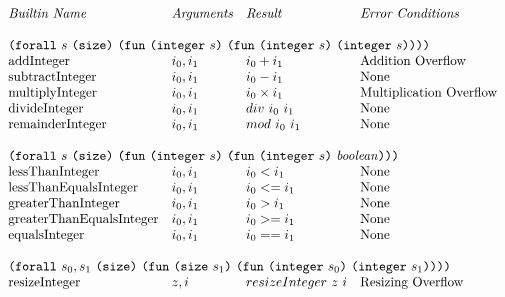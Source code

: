\documentclass[../main.tex]{subfiles}
\begin{document}
\begin{figure*}[t]
    \centering
    \footnotesize
    \[\begin{array}{llll}
        \textit{Builtin Name}               & \textit{Arguments} & \textit{Result} & \textit{Error Conditions}\\
        &&\\
        
        \multicolumn{4}{l}{\forallT{s}{\sizeK{}}{\funT{\integerT{s}}{\funT{\integerT{s}}{\integerT{s}}}}}\\
        \mathrm{addInteger}                 &  i_0 , i_1   &   i_0 + i_1         &   \textrm{Addition Overflow}   \\
        \mathrm{subtractInteger}            &  i_0 , i_1   &   i_0 - i_1         &   \textrm{None}       \\
        \mathrm{multiplyInteger}            &  i_0 , i_1   &   i_0 \times i_1    &   \textrm{Multiplication Overflow}   \\
        \mathrm{divideInteger}              &  i_0 , i_1   &   div ~ i_0 ~ i_1   &   \textrm{None}       \\
        \mathrm{remainderInteger}           &  i_0 , i_1   &   mod ~ i_0 ~ i_1   &   \textrm{None}       \\
        &&\\
        
        \multicolumn{4}{l}{\forallT{s}{\sizeK{}}{\funT{\integerT{s}}{\funT{\integerT{s}}{\mathit{boolean}}}}}\\
        \mathrm{lessThanInteger}            &  i_0 , i_1   &   i_0 < i_1    &   \textrm{None}         \\
        \mathrm{lessThanEqualsInteger}      &  i_0 , i_1   &   i_0 <= i_1   &   \textrm{None}         \\
        \mathrm{greaterThanInteger}         &  i_0 , i_1   &   i_0 > i_1    &   \textrm{None}         \\
        \mathrm{greaterThanEqualsInteger}   &  i_0 , i_1   &   i_0 >= i_1   &   \textrm{None}         \\
        \mathrm{equalsInteger}              &  i_0 , i_1   &   i_0 == i_1   &   \textrm{None}         \\
        &&\\
        
        \multicolumn{4}{l}{\forallT{s_0,s_1}{\sizeK{}}{\funT{\sizeT{s_1}}{\funT{\integerT{s_0}}{\integerT{s_1}}}}} \\
        \mathrm{resizeInteger}   &   z, i   &   resizeInteger ~ z ~ i   &   \textrm{Resizing Overflow} \\
        &&\\
        

\end{array}\]
\end{figure*}
\end{document}
